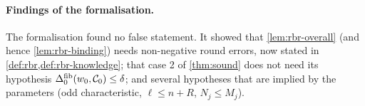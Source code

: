 \paragraph{Findings of the formalisation.}
The formalisation found no false statement. It showed that \cref{lem:rbr-overall} (and hence \cref{lem:rbr-binding}) needs non-negative round errors, now stated in \cref{def:rbr,def:rbr-knowledge}; that case 2 of \cref{thm:sound} does not need its hypothesis $\Delta^{\mathrm{fib}}_0(w_0, \mathcal{C}_0) \le \delta$; and several hypotheses that are implied by the parameters (odd characteristic, $\ell \le n + R$, $N_j \le M_j$).
